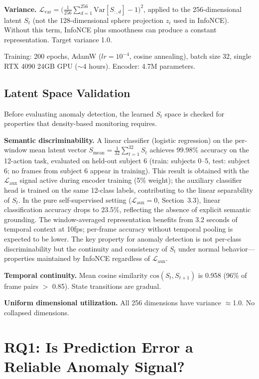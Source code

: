 \documentclass[11pt,a4paper]{article}
\begin{document}
\textbf{Variance.}
$\mathcal{L}_{\text{var}} = \big(\frac{1}{256}\sum_{d=1}^{256} \text{Var}[S_{:,d}] - 1\big)^2$, applied to the 256-dimensional latent $S_t$ (not the 128-dimensional sphere projection $z_i$ used in InfoNCE).
Without this term, InfoNCE plus smoothness can produce a constant representation. Target variance 1.0.

Training: 200 epochs, AdamW ($lr{=}10^{-4}$, cosine annealing), batch size 32, single RTX 4090 24GB GPU ($\sim$4 hours). Encoder: 4.7M parameters.

\subsection{Latent Space Validation}

Before evaluating anomaly detection, the learned $S_t$ space is checked for properties that density-based monitoring requires.

\textbf{Semantic discriminability.}
A linear classifier (logistic regression) on the per-window mean latent vector $S_{\text{mean}} = \frac{1}{32}\sum_{t=1}^{32} S_t$ achieves 99.98\% accuracy on the 12-action task, evaluated on held-out subject 6 (train: subjects 0--5, test: subject 6; no frames from subject 6 appear in training).
This result is obtained with the $\mathcal{L}_{\text{aux}}$ signal active during encoder training (5\% weight); the auxiliary classifier head is trained on the same 12-class labels, contributing to the linear separability of $S_t$.
In the pure self-supervised setting ($\mathcal{L}_{\text{aux}}{=}0$, Section~3.3), linear classification accuracy drops to 23.5\%, reflecting the absence of explicit semantic grounding.
The window-averaged representation benefits from 3.2 seconds of temporal context at 10fps; per-frame accuracy without temporal pooling is expected to be lower.
The key property for anomaly detection is not per-class discriminability but the continuity and consistency of $S_t$ under normal behavior---properties maintained by InfoNCE regardless of $\mathcal{L}_{\text{aux}}$.

\textbf{Temporal continuity.}
Mean cosine similarity $\text{cos}(S_t, S_{t+1})$ is 0.958 (96\% of frame pairs $>$ 0.85). State transitions are gradual.

\textbf{Uniform dimensional utilization.}
All 256 dimensions have variance $\approx$1.0. No collapsed dimensions.

\section{RQ1: Is Prediction Error a Reliable Anomaly Signal?}
\end{document}
